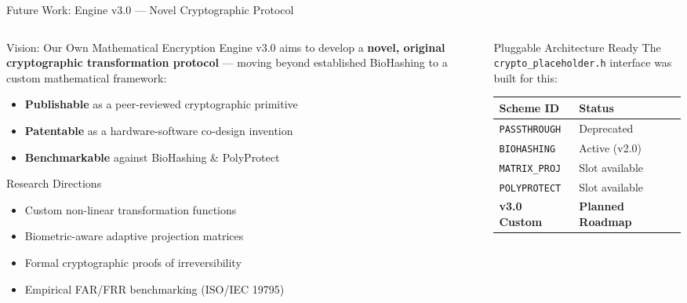 \documentclass[aspectratio=169, 11pt]{beamer}
\begin{document}
\begin{frame}{Future Work: Engine v3.0 — Novel Cryptographic Protocol}
  \begin{columns}[T]
    \begin{column}{0.52\textwidth}
      \begin{alertblock}{Vision: Our Own Mathematical Encryption}
        \small
        Engine v3.0 aims to develop a \textbf{novel, original cryptographic transformation protocol} — moving beyond established BioHashing to a custom mathematical framework:
        \begin{itemize}
          \item \textbf{Publishable} as a peer-reviewed cryptographic primitive
          \item \textbf{Patentable} as a hardware-software co-design invention
          \item \textbf{Benchmarkable} against BioHashing \& PolyProtect
        \end{itemize}
      \end{alertblock}
      \vspace{0.2em}
      \begin{block}{Research Directions}
        \small
        \begin{itemize}
          \item Custom non-linear transformation functions
          \item Biometric-aware adaptive projection matrices
          \item Formal cryptographic proofs of irreversibility
          \item Empirical FAR/FRR benchmarking (ISO/IEC 19795)
        \end{itemize}
      \end{block}
    \end{column}
    \begin{column}{0.45\textwidth}
      \begin{block}{Pluggable Architecture Ready}
        \small
        The \texttt{crypto\_placeholder.h} interface was built for this:
        \vspace{0.2em}
        \renewcommand{\arraystretch}{1.2}
        \begin{tabular}{ll}
          \toprule
          \textbf{Scheme ID} & \textbf{Status} \\
          \midrule
          \texttt{PASSTHROUGH} & Deprecated \\
          \texttt{BIOHASHING} & \textcolor{CodeGreen}{Active (v2.0)} \\
          \texttt{MATRIX\_PROJ} & Slot available \\
          \texttt{POLYPROTECT} & Slot available \\
          \textbf{v3.0 Custom} & \textcolor{AccentGold}{\textbf{Planned Roadmap}} \\
          \bottomrule
        \end{tabular}
        \vspace{0.3em}


\end{block}
\end{column}
\end{columns}
\end{frame}
\end{document}
